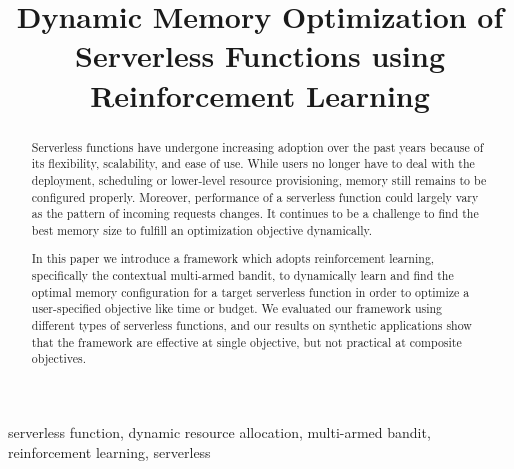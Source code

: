 \documentclass[conference]{IEEEtran}
\begin{document}
\title{Dynamic Memory Optimization of Serverless Functions using Reinforcement Learning\\

}

\author{
    \and
    \and
    \and
    \and
}

\maketitle

\begin{abstract}
Serverless functions have undergone increasing adoption over the past years because of its flexibility, scalability, and ease of use. While users no longer have to deal with the deployment, scheduling or lower-level resource provisioning, memory still remains to be configured properly. Moreover, performance of a serverless function could largely vary as the pattern of incoming requests changes. It continues to be a challenge to find the best memory size to fulfill an optimization objective dynamically. 

In this paper we introduce a framework which adopts reinforcement learning, specifically the contextual multi-armed bandit, to dynamically learn and find the optimal memory configuration for a target serverless function in order to optimize a user-specified objective like time or budget. We evaluated our framework using different types of serverless functions, and our results on synthetic applications show that the framework are effective at single objective, but not practical at composite objectives.
\end{abstract}

\begin{IEEEkeywords}
serverless function, dynamic resource allocation, multi-armed bandit, reinforcement learning, serverless
\end{IEEEkeywords}
\end{document}
